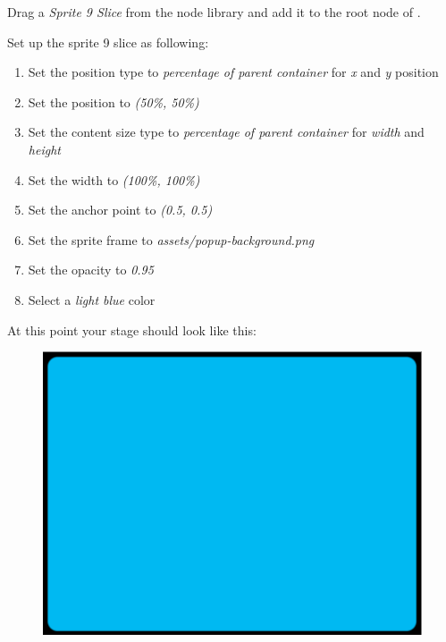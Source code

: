 \begin{leftbar}
Drag a \textit{Sprite 9 Slice} from the node library and add it to the root node
of .

Set up the sprite 9 slice as following:
\begin{enumerate}
  \item Set the position type to \textit{percentage of parent container} for
  \textit{x} and \textit{y} position
  \item Set the position to \textit{(50\%, 50\%)}
  \item Set the content size type to \textit{percentage of parent container} for
  \textit{width} and \textit{height}
  \item Set the width to \textit{(100\%, 100\%)} 
  \item Set the anchor point to \textit{(0.5, 0.5)}
  \item Set the sprite frame to \textit{assets/popup-background.png}
  \item Set the opacity to \textit{0.95}
  \item Select a \textit{light blue} color
\end{enumerate}
\end{leftbar} 

At this point your stage should look like this:
\begin{figure}[H]
    \centering
    \includegraphics[width=0.5\linewidth]{images/Chapter7/9_slice_setup.png}
\end{figure}

